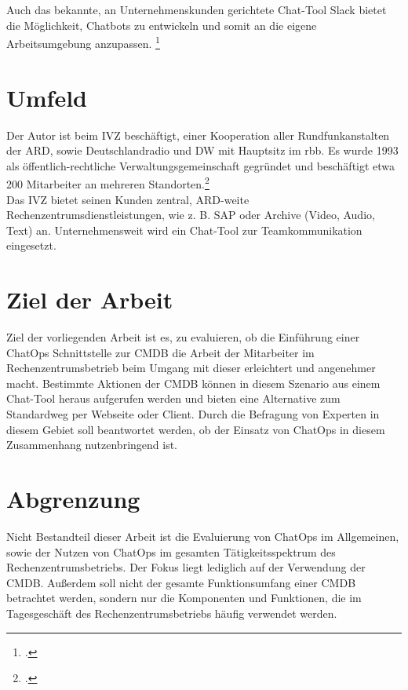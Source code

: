 Auch das bekannte, an Unternehmenskunden gerichtete Chat-Tool \acf{Slack} bietet die Möglichkeit, Chatbots zu entwickeln und somit an die eigene Arbeitsumgebung anzupassen. \footcite[Vgl.][o. \pno]{Koeltzsch_2019_Slack}


\section{Umfeld}
Der Autor ist beim \acf{IVZ} beschäftigt, einer Kooperation aller Rundfunkanstalten der \acf{ARD}, sowie Deutschlandradio und \acf{DW} mit Hauptsitz im \acf{rbb}.
Es wurde 1993 als öffentlich-rechtliche Verwaltungsgemeinschaft gegründet und beschäftigt etwa 200 Mitarbeiter an mehreren Standorten.\footcite[Vgl.][o. \pno]{ARD_2018_IVZ}\\
Das \acs{IVZ} bietet seinen Kunden zentral, \acs{ARD}-weite Rechenzentrumsdienstleistungen, wie z. B. SAP oder Archive (Video, Audio, Text) an. Unternehmensweit wird ein Chat-Tool zur Teamkommunikation eingesetzt.


\section{Ziel der Arbeit}
Ziel der vorliegenden Arbeit ist es, zu evaluieren, ob die Einführung einer ChatOps Schnittstelle zur \acf{CMDB} die Arbeit der Mitarbeiter im Rechenzentrumsbetrieb beim Umgang mit dieser erleichtert und angenehmer macht. Bestimmte Aktionen der \acs{CMDB} können in diesem Szenario aus einem Chat-Tool heraus aufgerufen werden und bieten eine Alternative zum Standardweg per Webseite oder Client. Durch die Befragung von Experten in diesem Gebiet soll beantwortet werden, ob der Einsatz von ChatOps in diesem Zusammenhang nutzenbringend ist.


\section{Abgrenzung}
Nicht Bestandteil dieser Arbeit ist die Evaluierung von ChatOps im Allgemeinen, sowie der Nutzen von ChatOps im gesamten Tätigkeitsspektrum des Rechenzentrumsbetriebs. Der Fokus liegt lediglich auf der Verwendung der CMDB. Außerdem soll nicht der gesamte Funktionsumfang einer \acs{CMDB} betrachtet werden, sondern nur die Komponenten und Funktionen, die im Tagesgeschäft des Rechenzentrumsbetriebs häufig verwendet werden.

